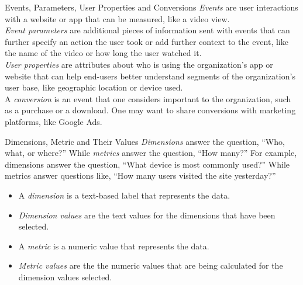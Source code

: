 \documentclass[pdf]{beamer}
\theoremstyle{remark}
\theoremstyle{definition}
\begin{document}
\begin{frame}[t]{Events, Parameters, User Properties and  Conversions}
\textit{Events} are user interactions with a website or app that can be measured, like a video view. \\
\vspace{1.5ex}
\textit{Event parameters} are additional pieces of information sent with events that can further specify an action the user took or add further context to the event, like the name of the video or how long the user watched it. \\
\vspace{1.5ex}
\textit{User properties} are attributes about who is using the organization's app or website that can help end-users better understand segments of the organization's user base, like geographic location or device used. \\
\vspace{1.5ex}
A \textit{conversion} is an event that one considers important to the organization, such as a purchase or a download. One may want to share conversions with marketing platforms, like Google Ads.
\end{frame}

\begin{frame}[t]{Dimensions, Metric and Their Values}
\textit{Dimensions} answer the question, ``Who, what, or where?'' While \textit{metrics} answer the question, ``How many?'' For example, dimensions answer the question, ``What device is most commonly used?'' While metrics answer questions like, ``How many users visited the site yesterday?'' \\
\small
\begin{itemize}
\item A \textit{dimension} is a text-based label that represents the data.
\item \textit {Dimension values} are the text values for the dimensions that have been selected. 
\item A \textit{metric} is a numeric value that represents the data.
\item \textit{Metric values} are the the numeric values that are being calculated for the dimension values selected.
\end{itemize}
\end{frame}
\end{document}
